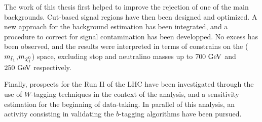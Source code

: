     The work of this thesis first helped to improve the rejection of one of the main backgrounds.
Cut-based signal regions have then been designed and optimized. A new approach for the background
estimation has been integrated, and a procedure to correct for signal contamination has
been developped. No excess has been observed, and the results were interpreted in terms of
constrains on the ($m_{\tilde{t}_1}$,$m_{\tilde{\chi}_1^0}$) space, excluding stop and neutralino
masses up to $700~\text{GeV}$ and $250~\text{GeV}$ respectively.

    Finally, prospects for the Run II of the LHC have been investigated through the use of
$W$-tagging techniques in the context of the analysis, and a sensitivity estimation for the
beginning of data-taking. In parallel of this analysis, an activity consisting in validating
the $b$-tagging algorithms have been pursued.
